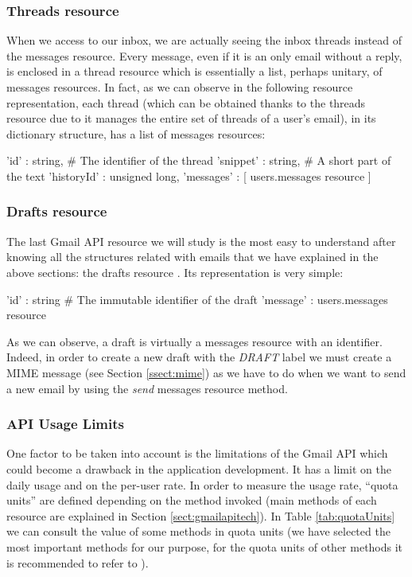 \subsubsection{Threads resource}\label{sssect:threads}
When we access to our inbox, we are actually seeing the inbox threads instead of the messages resource. Every message, even if it is an only email without a reply, is enclosed in a thread resource \citep[/v1/reference/users/threads]{gmailAPI} which is essentially a list, perhaps unitary, of messages resources. In fact, as we can observe in the following resource representation, each thread (which can be obtained thanks to the threads resource due to it manages the entire set of threads of a user's email), in its dictionary structure, has a list of messages resources:

\begin{python}
	{
		'id' : string, # The identifier of the thread
		'snippet' : string, # A short part of the text
		'historyId' : unsigned long,
		'messages' : [ users.messages resource ]
	}
\end{python}

\subsubsection{Drafts resource}\label{sssect:drafts}
The last Gmail API resource we will study is the most easy to understand after knowing all the structures related with emails that we have explained in the above sections: the drafts resource \citep[/v1/reference/users/drafts]{gmailAPI}. Its representation is very simple:

\begin{python}
	{
		'id' : string # The immutable identifier of the draft
		'message' : users.messages resource
	}
\end{python}

As we can observe, a draft is virtually a messages resource with an identifier. Indeed, in order to create a new draft with the \textit{DRAFT} label we must create a MIME message (see Section \ref{ssect:mime}) as we have to do when we want to send a new email by using the \textit{send} messages resource method.

\subsubsection{API Usage Limits} \label{sssect:apilimits}
One factor to be taken into account is the limitations of the Gmail API \citep[/v1/reference/quota]{gmailAPI} which could become a drawback in the application development. It has a limit on the daily usage and on the per-user rate. In order to measure the usage rate, ``quota units'' are defined depending on the method invoked (main methods of each resource are explained in Section \ref{sect:gmailapitech}). In Table \ref{tab:quotaUnits} we can consult the value of some methods in quota units (we have selected the most important methods for our purpose, for the quota units of other methods it is recommended to refer to \cite[/v1/reference/quota]{gmailAPI}).

